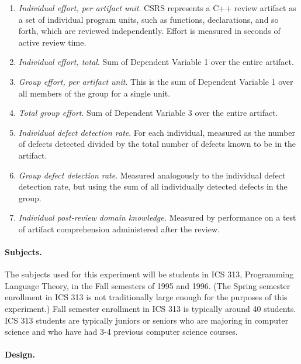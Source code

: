 \begin{enumerate}

\item {\em Individual effort, per artifact unit}. CSRS represents a C++ 
  review artifact as a set of individual program units, such as
  functions, declarations, and so forth, which are reviewed
  independently.  Effort is measured in seconds of active review
  time.

\item {\em Individual effort, total}. Sum of Dependent Variable 1 over the 
  entire artifact.

\item {\em Group effort, per artifact unit}.  This is the sum of
  Dependent Variable 1 over all members of the group for a single unit.

\item {\em Total group effort}.  Sum of Dependent Variable 3 over the
  entire artifact.

\item {\em Individual defect detection rate}.  For each individual, measured
  as the number of defects detected divided by the total number of defects
  known to be in the artifact.

\item {\em Group defect detection rate}. Measured analogously to the
  individual defect detection rate, but using the sum of all individually
  detected defects in the group.

\item {\em Individual post-review domain knowledge.}  Measured by
  performance on a test of artifact comprehension administered after the
  review.

\end{enumerate}

\paragraph {Subjects.}

The subjects used for this experiment will be students in ICS 313,
Programming Language Theory, in the Fall semesters of 1995 and 1996. (The
Spring semester enrollment in ICS 313 is not traditionally large enough
for the purposes of this experiment.)  Fall semester enrollment in ICS 313 
is typically around 40 students.  ICS 313 students are typically juniors or
seniors who are majoring in computer science and who have had 3-4 previous
computer science courses.

\paragraph {Design.}

